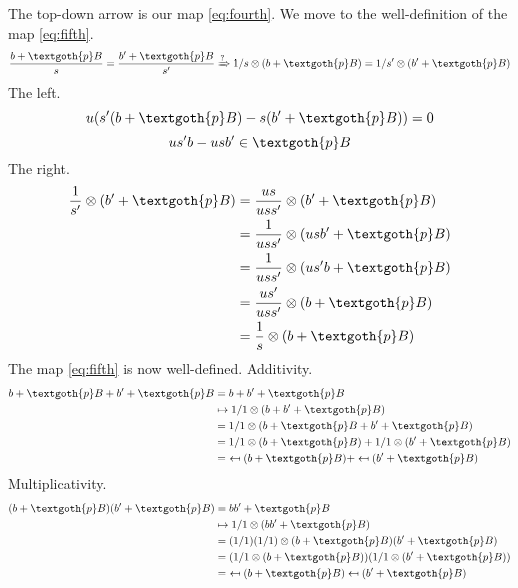 \documentclass{article}
\begin{document}
\noindent
The top-down arrow is our map \eqref{eq:fourth}. We move to the well-definition of the map \eqref{eq:fifth}.
\[
\frac{b + \textgoth{p}B}{s} = \frac{b' + \textgoth{p}B}{s'} 
\xRightarrow{?}
1/s \otimes (b + \textgoth{p}B) = 1/s' \otimes (b' + \textgoth{p}B)
\]
The left.
\[
u(s'(b + \textgoth{p}B) - s(b' + \textgoth{p}B)) = 0
\]
\[
us'b - usb' \in \textgoth{p}B
\]
The right.
\begin{align*}
\frac{1}{s'} \otimes (b' + \textgoth{p}B) 
& = \frac{us}{uss'} \otimes (b' + \textgoth{p}B) \\
& = \frac{1}{uss'} \otimes (usb' + \textgoth{p}B) \\
& = \frac{1}{uss'} \otimes (us'b + \textgoth{p}B) \\
& = \frac{us'}{uss'} \otimes (b + \textgoth{p}B) \\
& = \frac{1}{s} \otimes (b + \textgoth{p}B)
\end{align*}
The map \eqref{eq:fifth} is now well-defined. Additivity.
\begin{align*}
b + \textgoth{p}B + b' + \textgoth{p}B & = b + b' + \textgoth{p}B \\
& \mapsto 1/1 \otimes (b + b' + \textgoth{p}B) \\
& = 1/1 \otimes (b + \textgoth{p}B + b' + \textgoth{p}B) \\
& = 1/1 \otimes (b + \textgoth{p}B) + 1/1 \otimes (b' + \textgoth{p}B) \\
& = \ \mapsfrom (b + \textgoth{p}B) + \mapsfrom (b' + \textgoth{p}B)
\end{align*}
Multiplicativity.
\begin{align*}
(b + \textgoth{p}B)(b' + \textgoth{p}B) & = bb' + \textgoth{p}B \\
& \mapsto 1/1 \otimes (bb' + \textgoth{p}B) \\
& = (1/1)(1/1) \otimes (b + \textgoth{p}B)(b' + \textgoth{p}B) \\
& = (1/1 \otimes (b + \textgoth{p}B))(1/1 \otimes (b' + \textgoth{p}B)) \\
& = \ \mapsfrom (b + \textgoth{p}B) \mapsfrom (b' + \textgoth{p}B) 
\end{align*}
\end{document}
